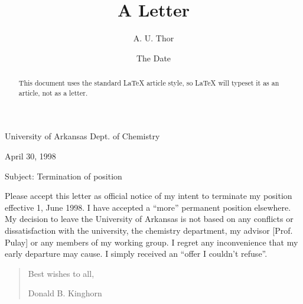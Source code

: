 \documentclass[12pt,thmsa]{article}
\begin{document}
\begin{abstract}
This document uses the standard \LaTeX{} article style, so \LaTeX{} will
typeset it as an article, not as a letter.
\end{abstract}

\author{A. U. Thor}
\title{A Letter}
\date{The Date }
\maketitle

\begin{quote}
\hspace{3.5in}\smallskip
\end{quote}

\begin{center}
\medskip University of Arkansas Dept. of Chemistry

April 30, 1998
\end{center}

\begin{quote}
\medskip

\medskip
\end{quote}

Subject: Termination of position

Please accept this letter as official notice of my intent to terminate my
position effective 1, June 1998. I have accepted a ``more'' permanent
position elsewhere. My decision to leave the University of Arkansas is not
based on any conflicts or dissatisfaction with the university, the chemistry
department, my advisor [Prof. Pulay] or any members of my working group. I
regret any inconvenience that my early departure may cause. I simply
received an ``offer I couldn't refuse''.

\begin{quote}
\hspace{2.5in}Best wishes to all,

\medskip

\medskip

\hspace{2.5in}Donald B. Kinghorn

\medskip
\end{quote}
\end{document}
